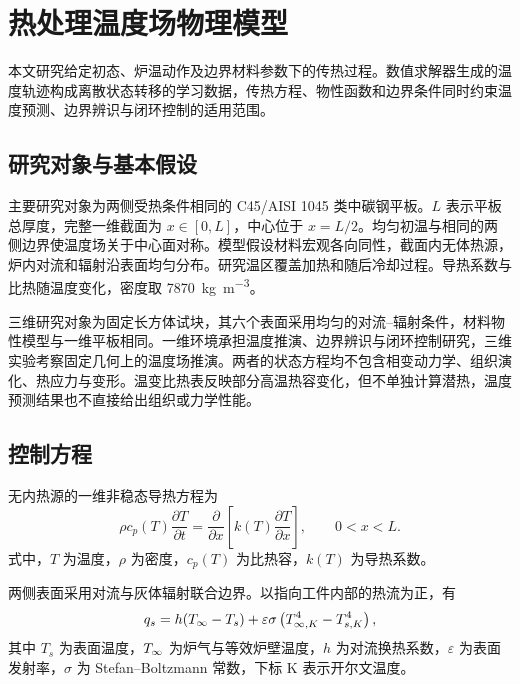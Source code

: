 \chapter{热处理温度场物理模型}

本文研究给定初态、炉温动作及边界材料参数下的传热过程。数值求解器生成的温度轨迹构成离散状态转移的学习数据，传热方程、物性函数和边界条件同时约束温度预测、边界辨识与闭环控制的适用范围。

\section{研究对象与基本假设}

主要研究对象为两侧受热条件相同的 C45/AISI 1045 类中碳钢平板。$L$ 表示平板总厚度，完整一维截面为 $x\in[0,L]$，中心位于 $x=L/2$。均匀初温与相同的两侧边界使温度场关于中心面对称。模型假设材料宏观各向同性，截面内无体热源，炉内对流和辐射沿表面均匀分布。研究温区覆盖加热和随后冷却过程。导热系数与比热随温度变化，密度取 \SI{7870}{\kilogram\per\cubic\metre}。

三维研究对象为固定长方体试块，其六个表面采用均匀的对流--辐射条件，材料物性模型与一维平板相同。一维环境承担温度推演、边界辨识与闭环控制研究，三维实验考察固定几何上的温度场推演。两者的状态方程均不包含相变动力学、组织演化、热应力与变形。温变比热表反映部分高温热容变化，但不单独计算潜热，温度预测结果也不直接给出组织或力学性能。

\section{控制方程}

无内热源的一维非稳态导热方程为
\begin{equation}
  \rho c_p(T)\frac{\partial T}{\partial t}
  =\frac{\partial}{\partial x}\left[k(T)\frac{\partial T}{\partial x}\right],
  \qquad 0<x<L.
  \label{eq:heat_pde}
\end{equation}
式中，$T$ 为温度，$\rho$ 为密度，$c_p(T)$ 为比热容，$k(T)$ 为导热系数。

两侧表面采用对流与灰体辐射联合边界。以指向工件内部的热流为正，有
\begin{equation}
  q_s=h({T_{\infty}}-T_s)
  +\varepsilon\sigma\left(T_{\infty,K}^{4}-T_{s,K}^{4}\right),
  \label{eq:mixed_boundary}
\end{equation}
其中 $T_s$ 为表面温度，${T_{\infty}}$ 为炉气与等效炉壁温度，$h$ 为对流换热系数，$\varepsilon$ 为表面发射率，$\sigma$ 为 Stefan--Boltzmann 常数，下标 K 表示开尔文温度。

